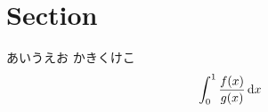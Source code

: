 %

\pagestyle{fancy}%
\fancyhead[L]{\textsc{\rightmark}}%
\fancyhead[C]{}%
\fancyhead[R]{\thepage}%
\fancyfoot{}%
\renewcommand{\headrulewidth}{0.1pt}%


\section{Section}
あいうえお
かきくけこ
\begin{gather}%
  \int_0^1 \frac{f(x)}{g(x)} \dl{x}
\end{gather}%
%
